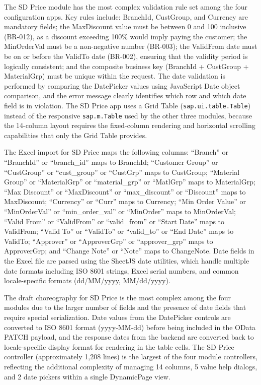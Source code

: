 \documentclass[12pt,a4paper]{report}
\begin{document}
The SD Price module has the most complex validation rule set among the four configuration apps. Key rules include: BranchId, CustGroup, and Currency are mandatory fields; the MaxDiscount value must be between 0 and 100 inclusive (BR-012), as a discount exceeding 100\% would imply paying the customer; the MinOrderVal must be a non-negative number (BR-003); the ValidFrom date must be on or before the ValidTo date (BR-002), ensuring that the validity period is logically consistent; and the composite business key (BranchId + CustGroup + MaterialGrp) must be unique within the request. The date validation is performed by comparing the DatePicker values using JavaScript Date object comparison, and the error message clearly identifies which row and which date field is in violation. The SD Price app uses a Grid Table (\texttt{sap.ui.table.Table}) instead of the responsive \texttt{sap.m.Table} used by the other three modules, because the 14-column layout requires the fixed-column rendering and horizontal scrolling capabilities that only the Grid Table provides.

The Excel import for SD Price maps the following columns: ``Branch'' or ``BranchId'' or ``branch\_id'' maps to BranchId; ``Customer Group'' or ``CustGroup'' or ``cust\_group'' or ``CustGrp'' maps to CustGroup; ``Material Group'' or ``MaterialGrp'' or ``material\_grp'' or ``MatlGrp'' maps to MaterialGrp; ``Max Discount'' or ``MaxDiscount'' or ``max\_discount'' or ``Discount'' maps to MaxDiscount; ``Currency'' or ``Curr'' maps to Currency; ``Min Order Value'' or ``MinOrderVal'' or ``min\_order\_val'' or ``MinOrder'' maps to MinOrderVal; ``Valid From'' or ``ValidFrom'' or ``valid\_from'' or ``Start Date'' maps to ValidFrom; ``Valid To'' or ``ValidTo'' or ``valid\_to'' or ``End Date'' maps to ValidTo; ``Approver'' or ``ApproverGrp'' or ``approver\_grp'' maps to ApproverGrp; and ``Change Note'' or ``Note'' maps to ChangeNote. Date fields in the Excel file are parsed using the SheetJS date utilities, which handle multiple date formats including ISO 8601 strings, Excel serial numbers, and common locale-specific formats (dd/MM/yyyy, MM/dd/yyyy).

The draft choreography for SD Price is the most complex among the four modules due to the larger number of fields and the presence of date fields that require special serialization. Date values from the DatePicker controls are converted to ISO 8601 format (yyyy-MM-dd) before being included in the OData PATCH payload, and the response dates from the backend are converted back to locale-specific display format for rendering in the table cells. The SD Price controller (approximately 1,208 lines) is the largest of the four module controllers, reflecting the additional complexity of managing 14 columns, 5 value help dialogs, and 2 date pickers within a single DynamicPage view.
\end{document}
